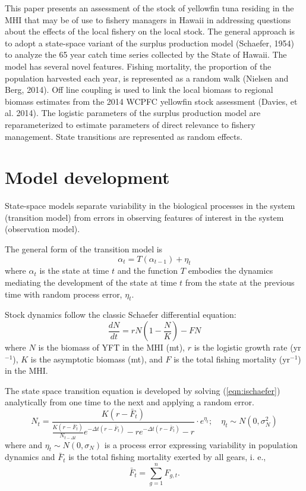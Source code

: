 \documentclass[12pt,letterpaper]{article}
\newcommand\peryr{yr$^{-1}$}
\begin{document}
This paper presents an assessment of the stock of yellowfin tuna
residing in the MHI that may be of use to fishery managers in Hawaii
in addressing questions about the effects of the local fishery on the
local stock. The general approach is to adopt a state-space variant of
the surplus production model  (Schaefer, 1954) to analyze the 65 year
catch time series collected by the State of Hawaii. 
The model has several novel features.
Fishing mortality, the proportion of the population harvested each
year, is represented as a random walk (Nielsen and Berg, 2014).
Off line coupling is used to link the local biomass to 
regional biomass estimates from the 2014 WCPFC yellowfin stock assessment
(Davies, et al. 2014).
The logistic parameters of the surplus production model are
reparameterized to estimate parameters of direct relevance to fishery
management. State transitions are represented as random effects.


\section*{Model development}
\label{sec:models}
State-space models separate variability in the biological
processes in the system (transition model)
from errors in observing features of interest
in the system (observation model).

The general form of the transition model is
\begin{equation}
\alpha_t=T(\alpha_{t-1}) + \eta_t
\end{equation}
where $\alpha_t$ is the state at time $t$ and 
the function $T$ embodies the dynamics mediating the
development of the state at time $t$ from the state at the previous
time with random process error, $\eta_t$.

Stock dynamics follow the classic Schaefer differential equation:
\begin{equation}
\label{eqn:ischaefer}
\frac{dN}{dt} = rN(1-\frac{N}{K}) - FN
\end{equation}
where $N$ is the biomass of YFT in the MHI (mt), 
$r$ is the logistic growth rate (\peryr),
$K$ is the asymptotic biomass (mt), and
$F$ is the total fishing mortality (\peryr) in the MHI.

The state space transition equation is developed by solving
(\ref{eqn:ischaefer}) analytically from one time to the next and
applying a random error.
\begin{equation}
\label{eqn:intschaeferA}
N_t = \frac{K(r-\bar{F}_t)}{\frac{K(r-\bar{F}_t)}{N_{t-\Delta t}}e^{-\Delta
t(r-\bar{F}_t)}-re^{-\Delta t(r-\bar{F}_t)} -r} \cdot e^{\eta_t};
\quad \eta_t\sim N(0,\sigma^2_N)
\end{equation}
where 
and $\eta_t \sim N(0,\sigma_N)$ is a process error expressing
variability in population dynamics
and $\bar{F}_t$ is the total fishing mortality exerted by all gears, i. e.,
$$
\bar{F}_t =\sum_{g=1}^n F_{g,t}.
$$
\end{document}
